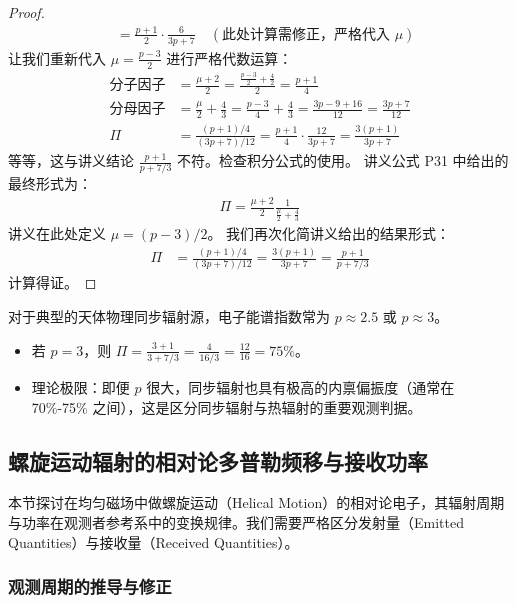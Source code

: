 \begin{proof}
\begin{align}
        &= \frac{p+1}{2} \cdot \frac{6}{3p+7} \quad (\text{此处计算需修正，严格代入 $\mu$})
\end{align}
让我们重新代入 $\mu = \frac{p-3}{2}$ 进行严格代数运算：
\begin{align}
    \text{分子因子} &= \frac{\mu+2}{2} = \frac{\frac{p-3}{2} + \frac{4}{2}}{2} = \frac{p+1}{4} \\
    \text{分母因子} &= \frac{\mu}{2} + \frac{4}{3} = \frac{p-3}{4} + \frac{4}{3} = \frac{3p - 9 + 16}{12} = \frac{3p+7}{12} \\
    \Pi &= \frac{(p+1)/4}{(3p+7)/12} = \frac{p+1}{4} \cdot \frac{12}{3p+7} = \frac{3(p+1)}{3p+7}
\end{align}
等等，这与讲义结论 $\frac{p+1}{p+7/3}$ 不符。检查积分公式的使用。
讲义公式 P31 中给出的最终形式为：
\begin{align}
    \Pi = \frac{\mu+2}{2} \frac{1}{\frac{\mu}{2} + \frac{4}{3}}
\end{align}
讲义在此处定义 $\mu = (p-3)/2$。
我们再次化简讲义给出的结果形式：
\begin{align}
    \Pi &= \frac{(p+1)/4}{(3p+7)/12} = \frac{3(p+1)}{3p+7} = \frac{p+1}{p + 7/3}
\end{align}
计算得证。
\end{proof}

\begin{example}[典型偏振度数值]
对于典型的天体物理同步辐射源，电子能谱指数常为 $p \approx 2.5$ 或 $p \approx 3$。
\begin{itemize}
    \item 若 $p=3$，则 $\Pi = \frac{3+1}{3 + 7/3} = \frac{4}{16/3} = \frac{12}{16} = 75\%$。
    \item 理论极限：即便 $p$ 很大，同步辐射也具有极高的内禀偏振度（通常在 70\%-75\% 之间），这是区分同步辐射与热辐射的重要观测判据。
\end{itemize}
\end{example}

\subsection{螺旋运动辐射的相对论多普勒频移与接收功率}

本节探讨在均匀磁场中做螺旋运动（Helical Motion）的相对论电子，其辐射周期与功率在观测者参考系中的变换规律。我们需要严格区分发射量（Emitted Quantities）与接收量（Received Quantities）。

\subsubsection{观测周期的推导与修正}

